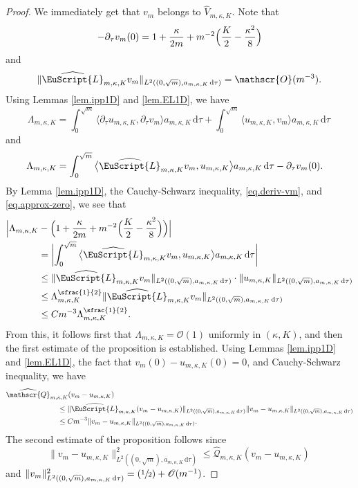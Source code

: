 \documentclass[JEP,XML,SOM,Unicode]{cedram}
\let\mathcal \EuScript
\newcommand{\Psfrac}[2]{(\sfrac{#1}{#2})}
\newcommand{\scrO}{\mathscr{O}}
\newcommand{\scrQ}{\mathscr{Q}}
\newcommand{\cL}{\mathcal{L}}
\theoremstyle{plain}
\theoremstyle{definition}
\newcommand{\dx}{\mathrm{\,d}}
\let\pa\partial
\begin{document}
\begin{proof}
We immediately get that $v_m$ belongs to $\widehat{V}_{m,\kappa,K}$. Note that
\begin{equation}\label{eq.deriv-vm}
-\partial_{\tau}v_{m}(0)=1 + \frac{\kappa}{2m} + m^{-2}\Bigl(
\frac{K}{2} - \frac{\kappa^2}{8}
\Bigr)
\end{equation}
and
\begin{equation}\label{eq.approx-zero}
\|\widehat{\cL}_{m,\kappa,K} v_m\|_{L^2((0,\sqrt{m}), a_{m,\kappa,K}\dx\tau)} = \scrO(m^{-3}).
\end{equation}
Using Lemmas \ref{lem.ipp1D} and \ref{lem.EL1D}, we have
\[ \Lambda_{m,\kappa,K}=
\int_0^{\sqrt{m}}\big\langle
\pa_\tau u_{m,\kappa,K},\pa_\tau v_m
\big\rangle a_{m,\kappa,K}\dx\tau
+
\int_0^{\sqrt{m}}\big\langle
u_{m,\kappa,K},v_m
\big\rangle a_{m,\kappa,K}\dx\tau\,
\]
and
\[\begin{split}
&
\Lambda_{m,\kappa,K}
=\int_0^{\sqrt{m}}\big\langle
\widehat{\cL}_{m,\kappa,K} v_m,u_{m,\kappa,K}
\big\rangle a_{m,\kappa,K}\dx\tau
-
\pa_\tau v_{m}(0).
\end{split}\]
By Lemma \ref{lem.ipp1D}, the Cauchy-Schwarz inequality, \eqref{eq.deriv-vm}, and \eqref{eq.approx-zero}, we see that
\[\begin{split}
\Bigl|\Lambda_{m,\kappa,K}&-\Bigl(
1 + \frac{\kappa}{2m} + m^{-2}\Bigl(
\frac{K}{2} - \frac{\kappa^2}{8}
\Bigr)
\Bigr)\Bigr|
\\
&= \biggl|
\int_0^{\sqrt{m}}\big\langle
\widehat{\cL}_{m,\kappa,K} v_m,
u_{m,\kappa,K}
\big\rangle a_{m,\kappa,K}\dx\tau
\biggr|
\\
&\leq
\|\widehat{\cL}_{m,\kappa,K} v_m\|_{L^2((0,\sqrt{m}), a_{m,\kappa,K}\dx\tau)}\cdot
\|u_{m,\kappa,K}\|_{L^2((0,\sqrt{m}), a_{m,\kappa,K}\dx\tau)}
\\
&\leq \Lambda_{m,\kappa, K}^{\sfrac{1}{2}} \|\widehat{\cL}_{m,\kappa,K} v_m\|_{L^2((0,\sqrt{m}), a_{m,\kappa,K}\dx\tau)} \\
&\leq Cm^{-3}\Lambda_{m,\kappa, K}^{\sfrac{1}{2}}.
\end{split}\]
From this, it follows first that $\Lambda_{m,\kappa,K}=\scrO(1)$ uniformly in $(\kappa, K)$, and then the first estimate of the proposition is established.
Using Lemmas \ref{lem.ipp1D} and \ref{lem.EL1D}, the fact that $v_{m}(0)-u_{m,\kappa,K}(0) = 0$, and Cauchy-Schwarz inequality, we have
\begin{align*}
\widehat{\scrQ}_{m,\kappa,K}&(v_{m}-u_{m,\kappa,K})\\
&\hspace*{-.5cm}\leq \|\widehat{\cL}_{m,\kappa,K} (v_m-u_{m,\kappa,K})\|_{L^2((0,\sqrt{m}), a_{m,\kappa,K}\dx\tau)}\|v_m-u_{m,\kappa,K}\|_{L^2((0,\sqrt{m}), a_{m,\kappa,K}\dx\tau)}\\
&\hspace*{-.5cm}\leq Cm^{-3}\|v_m-u_{m,\kappa,K}\|_{L^2((0,\sqrt{m}), a_{m,\kappa,K}\dx\tau)}.
\end{align*}
The second estimate of the proposition follows since
\[\|v_m-u_{m,\kappa,K}\|_{L^2((0,\sqrt{m}), a_{m,\kappa,K}\dx\tau)}^2\leq\widehat{\scrQ}_{m,\kappa,K}(v_{m}-u_{m,\kappa,K})\,\]
and $\|v_{m}\|_{L^2((0,\sqrt{m}), a_{m,\kappa,K}\dx\tau)}^2=\Psfrac{1}{2}+\scrO(m^{-1})$.
\end{proof}
\end{document}
